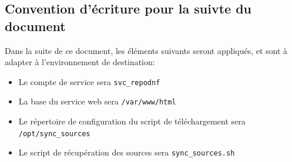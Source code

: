 \subsection{Convention d'écriture pour la suivte du document}
Dans la suite de ce document, les éléments suivants seront appliqués, et sont à adapter à l'environnement de destination:
\begin{itemize}
    \item Le compte de service sera \texttt{svc\_repodnf}
    \item La base du service web sera \texttt{/var/www/html}
    \item Le répertoire de configuration du script de téléchargement sera \texttt{/opt/sync\_sources}
    \item Le script de récupération des sources sera \texttt{sync\_sources.sh}
\end{itemize}